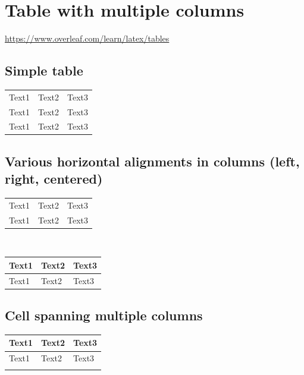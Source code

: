 \documentclass{report}
\begin{document}
    \chapter{Table with multiple columns}
    \url{https://www.overleaf.com/learn/latex/tables}
    \section{Simple table}
    \begin{center}
        \begin{tabular}{ |c|c|c| } 
            \hline
            Text1 & Text2 & Text3 \\ 
            Text1 & Text2 & Text3 \\ 
            Text1 & Text2 & Text3 \\ 
            \hline
        \end{tabular}
    \end{center}
    \section{Various horizontal alignments in columns (left, right, centered)}
    \begin{tabularx}{0.8\textwidth} { 
        | >{\raggedright\arraybackslash}X
        | >{\centering\arraybackslash}X 
        | >{\raggedleft\arraybackslash}X | }
        \hline
        Text1 & Text2 & Text3 \\
        Text1 & Text2 & Text3  \\
        \hline
    \end{tabularx}\\
    \begin{tabularx}{0.8\textwidth} { 
        | >{\raggedright\arraybackslash}X
        | >{\centering\arraybackslash}X 
        | >{\raggedleft\arraybackslash}X | }
        \hline
        Text1 & Text2 & Text3 \\
        \hline
        Text1 & Text2 & Text3  \\
        \hline
    \end{tabularx}
    \section{Cell spanning multiple columns}
    \begin{tabularx}{0.8\textwidth} { 
        | >{\raggedright\arraybackslash}X
        | >{\centering\arraybackslash}X 
        | >{\raggedleft\arraybackslash}X | }
        \hline
        Text1 & Text2 & Text3 \\
        \hline
        Text1 & Text2 & Text3  \\
        \hline
        \multicolumn{3}{| c |}{Cell spanning text}\\
        \hline
    \end{tabularx}
\end{document}
